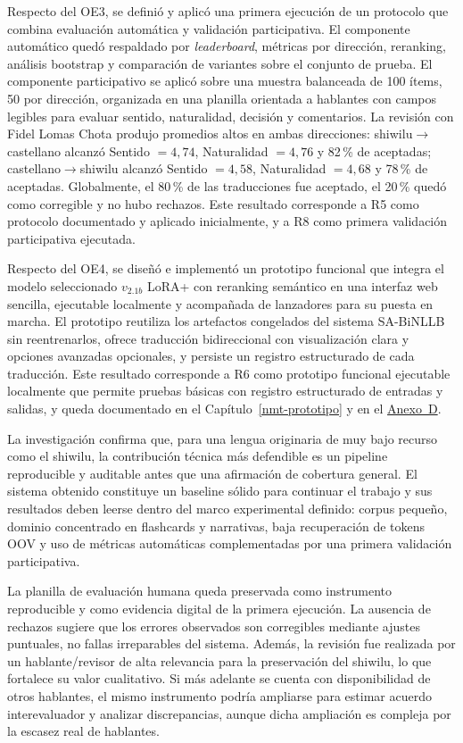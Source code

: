 \documentclass[12pt,a4paper,oneside]{book}
\begin{document}
Respecto del OE3, se definió y aplicó una primera ejecución de un protocolo que combina evaluación automática y validación participativa. El componente automático quedó respaldado por \emph{leaderboard}, métricas por dirección, reranking, análisis bootstrap y comparación de variantes sobre el conjunto de prueba. El componente participativo se aplicó sobre una muestra balanceada de 100 ítems, 50 por dirección, organizada en una planilla orientada a hablantes con campos legibles para evaluar sentido, naturalidad, decisión y comentarios. La revisión con Fidel Lomas Chota produjo promedios altos en ambas direcciones: shiwilu\(\rightarrow\)castellano alcanzó Sentido \(=4{,}74\), Naturalidad \(=4{,}76\) y 82\,\% de aceptadas; castellano\(\rightarrow\)shiwilu alcanzó Sentido \(=4{,}58\), Naturalidad \(=4{,}68\) y 78\,\% de aceptadas. Globalmente, el 80\,\% de las traducciones fue aceptado, el 20\,\% quedó como corregible y no hubo rechazos. Este resultado corresponde a R5 como protocolo documentado y aplicado inicialmente, y a R8 como primera validación participativa ejecutada.

Respecto del OE4, se diseñó e implementó un prototipo funcional que integra el modelo seleccionado \(v_{2.1b}\) LoRA+ con reranking semántico en una interfaz web sencilla, ejecutable localmente y acompañada de lanzadores para su puesta en marcha. El prototipo reutiliza los artefactos congelados del sistema SA-BiNLLB sin reentrenarlos, ofrece traducción bidireccional con visualización clara y opciones avanzadas opcionales, y persiste un registro estructurado de cada traducción. Este resultado corresponde a R6 como prototipo funcional ejecutable localmente que permite pruebas básicas con registro estructurado de entradas y salidas, y queda documentado en el Capítulo~\ref{nmt-prototipo} y en el \hyperref[anexo-prototipo]{Anexo~D}.

La investigación confirma que, para una lengua originaria de muy bajo recurso como el shiwilu, la contribución técnica más defendible es un pipeline reproducible y auditable antes que una afirmación de cobertura general. El sistema obtenido constituye un baseline sólido para continuar el trabajo y sus resultados deben leerse dentro del marco experimental definido: corpus pequeño, dominio concentrado en flashcards y narrativas, baja recuperación de tokens OOV y uso de métricas automáticas complementadas por una primera validación participativa.

La planilla de evaluación humana queda preservada como instrumento reproducible y como evidencia digital de la primera ejecución. La ausencia de rechazos sugiere que los errores observados son corregibles mediante ajustes puntuales, no fallas irreparables del sistema. Además, la revisión fue realizada por un hablante/revisor de alta relevancia para la preservación del shiwilu, lo que fortalece su valor cualitativo. Si más adelante se cuenta con disponibilidad de otros hablantes, el mismo instrumento podría ampliarse para estimar acuerdo interevaluador y analizar discrepancias, aunque dicha ampliación es compleja por la escasez real de hablantes.
\end{document}
